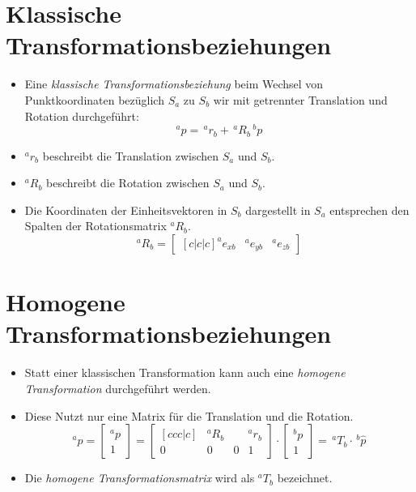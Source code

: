 \section{Klassische Transformationsbeziehungen} %
	\begin{itemize}
		\item Eine \textit{klassische Transformationsbeziehung} beim Wechsel von Punktkoordinaten bezüglich \( S _ a \) zu \( S _ b \) wir mit getrennter Translation und Rotation durchgeführt:
			\begin{equation*}
				^ap = \,^ar_b + \,^aR_b \,^bp
			\end{equation*}
		\item \( ^ar_b \) beschreibt die Translation zwischen \( S _ a \) und \( S _ b \).
		\item \( ^aR_b \) beschreibt die Rotation zwischen \( S _ a \) und \( S _ b \).
		\item Die Koordinaten der Einheitsvektoren in \( S _ b \) dargestellt in \( S _ a \) entsprechen den Spalten der Rotationsmatrix \( ^aR_b \).
			\begin{equation*}
				^aR_b =
				\begin{bmatrix}[c|c|c]
					^ae_{xb} & ^ae_{yb} & ^ae_{zb}
				\end{bmatrix}
			\end{equation*}
	\end{itemize}

\section{Homogene Transformationsbeziehungen} %
	\label{sec:homogeneMatrix}

	\begin{itemize}
		\item Statt einer klassischen Transformation kann auch eine \textit{homogene Transformation} durchgeführt werden.
		\item Diese Nutzt nur eine Matrix für die Translation und die Rotation.
			\begin{equation*}
				^a\hat{p} =
				\begin{bmatrix}
					^ap \\ \hline
					1
				\end{bmatrix}
				=
				\begin{bmatrix}[ccc|c]
					  & ^aR_b &   & ^ar_b \\ \hline
					0 & 0     & 0 & 1
				\end{bmatrix}
				\cdot
				\begin{bmatrix}
					^bp \\ \hline
					1
				\end{bmatrix}
				= \,^aT_b \cdot \,^b\hat{p}
			\end{equation*}
		\item Die \textit{homogene Transformationsmatrix} wird als \( ^aT_b \) bezeichnet.
	\end{itemize}

